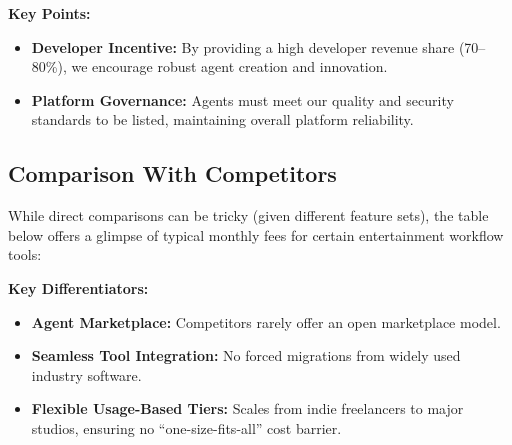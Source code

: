 \documentclass[11pt]{article}
\begin{document}
\noindent \textbf{Key Points:}
\begin{itemize}
    \item \textbf{Developer Incentive:} By providing a high developer revenue share (70--80\%), we encourage robust agent creation and innovation.
    \item \textbf{Platform Governance:} Agents must meet our quality and security standards to be listed, maintaining overall platform reliability.
\end{itemize}

\subsection{Comparison With Competitors}
While direct comparisons can be tricky (given different feature sets), the table below offers a glimpse of typical monthly fees for certain entertainment workflow tools:

\begin{table}[H]
\centering
{}
\caption{Illustrative Pricing Landscape}
\end{table}

\textbf{Key Differentiators:}
\begin{itemize}
    \item \textbf{Agent Marketplace:} Competitors rarely offer an open marketplace model.
    \item \textbf{Seamless Tool Integration:} No forced migrations from widely used industry software.
    \item \textbf{Flexible Usage-Based Tiers:} Scales from indie freelancers to major studios, ensuring no “one-size-fits-all” cost barrier.
\end{itemize}
\end{document}
